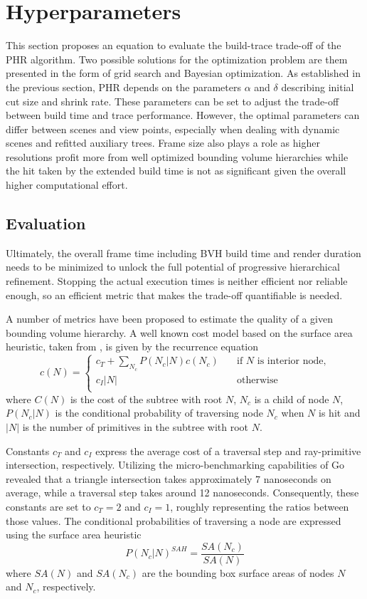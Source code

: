 \section{Hyperparameters}
\label{parameters}
This section proposes an equation to evaluate the build-trace trade-off of the PHR algorithm. Two possible solutions for the optimization problem are them presented in the form of grid search and Bayesian optimization. As established in the previous section, PHR depends on the parameters $\alpha$ and $\delta$ describing initial cut size and shrink rate. These parameters can be set to adjust the trade-off between build time and trace performance. However, the optimal parameters can differ between scenes and view points, especially when dealing with dynamic scenes and refitted auxiliary trees.
Frame size also plays a role as higher resolutions profit more from well optimized bounding volume hierarchies while the hit taken by the extended build time is not as significant given the overall higher computational effort. 
\subsection{Evaluation}
\label{evaluation}
Ultimately, the overall frame time including BVH build time and render duration needs to be minimized to unlock the full potential of progressive hierarchical refinement. Stopping the actual execution times is neither efficient nor reliable enough, so an efficient metric that makes the trade-off quantifiable is needed. 

A number of metrics have been proposed to estimate the quality of a given bounding volume hierarchy. A well known cost model based on the surface area heuristic, taken from \cite{meister21survey}, is given by the recurrence equation 
\[
c(N) =  
    \begin{cases}
        c_T + \sum_{N_c}P(N_c|N)c(N_c) &\quad\text{if }N\text{ is interior node,}\\
        c_I|N|&\quad\text{otherwise}\\
    \end{cases}
\]
where $C(N)$ is the cost of the subtree with root $N$, $N_c$ is a child of node $N$, $P(N_c|N)$ is the conditional probability of traversing node $N_c$ when $N$ is hit and $|N|$ is the number of primitives in the subtree with root $N$. 

Constants $c_T$ and $c_I$ express the average cost of a traversal step and ray-primitive intersection, respectively. Utilizing the micro-benchmarking capabilities of Go revealed that a triangle intersection takes approximately 7 nanoseconds on average, while a traversal step takes around 12 nanoseconds. Consequently, these constants are set to $c_T = 2$ and $c_I = 1$, roughly representing the ratios between those values. 
The conditional probabilities of traversing a node are expressed using the surface area heuristic\cite{goldsmith_automatic_1987,macdonald_heuristics_1990}
\[
P(N_c|N)^{SAH} = \frac{SA(N_c)}{SA(N)}
\]
where $SA(N)$ and $SA(N_c)$  are the bounding box surface areas of nodes $N$ and $N_c$, respectively. 

